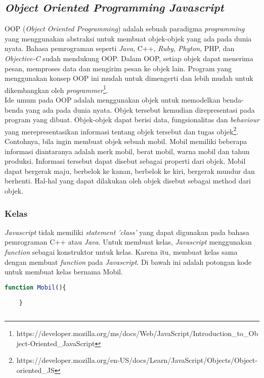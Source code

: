 \subsection{\textit{Object Oriented Programming Javascript}}
OOP (\textit{Object Oriented Programming}) adalah sebuah paradigma \textit{programming} yang menggunakan abstraksi untuk membuat objek-objek yang ada pada dunia nyata. Bahasa pemrograman seperti \textit{Java}, C++, \textit{Ruby, Phyton}, PHP, dan \textit{Objective-C} sudah mendukung OOP. Dalam OOP, setiap objek dapat menerima pesan, memproses data dan mengirim pesan ke objek lain. Program yang menggunakan konsep OOP ini mudah untuk dimengerti dan lebih mudah untuk dikembangkan oleh \textit{programmer}\footnote{https://developer.mozilla.org/ms/docs/Web/JavaScript/Introduction\_to\_Object-Oriented\_JavaScript}. \\

Ide umum pada OOP adalah menggunakan objek untuk memodelkan benda-benda yang ada pada dunia nyata. Objek tersebut kemudian direpresentasi pada program yang dibuat. Objek-objek dapat berisi data, fungsionalitas dan \textit{behaviour} yang merepresentasikan informasi tentang objek tersebut dan tugas objek\footnote{https://developer.mozilla.org/en-US/docs/Learn/JavaScript/Objects/Object-oriented\_JS}. Contohnya, bila ingin membuat objek sebuah mobil. Mobil memiliki beberapa informasi diantaranya adalah merk mobil, berat mobil, warna mobil dan tahun produksi. Informasi tersebut dapat disebut sebagai properti dari objek. Mobil dapat bergerak maju, berbelok ke kanan, berbelok ke kiri, bergerak mundur dan berhenti. Hal-hal yang dapat dilakukan oleh objek disebut sebagai method dari objek. 

\subsubsection{Kelas}
\textit{Javascript} tidak memiliki \textit{statement 'class'} yang dapat digunakan pada bahasa pemrograman C++ atau \textit{Java}. Untuk membuat kelas, \textit{Javascript} menggunakan \textit{function} sebagai konstruktor untuk kelas. Karena itu, membuat kelas sama dengan membuat \textit{function} pada \textit{Javascript}. Di bawah ini adalah potongan kode untuk membuat kelas bernama Mobil.

\begin{lstlisting}[language=Javascript, caption=Membuat kelas Mobil]
	function Mobil(){
	
	}
	
\end{lstlisting}

